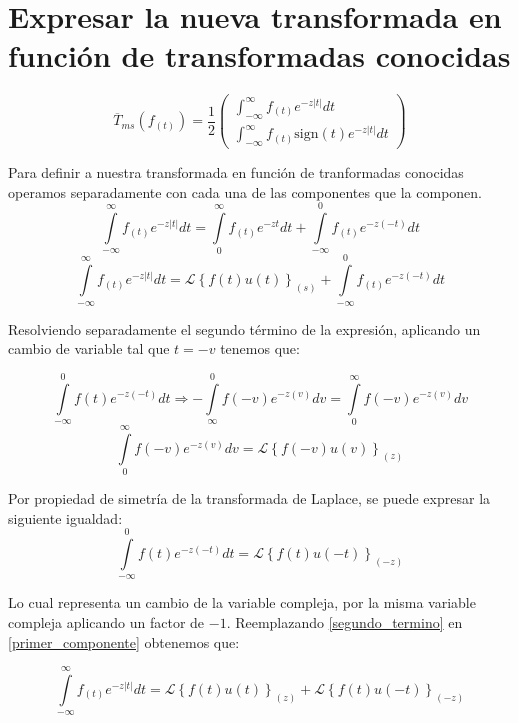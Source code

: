 \documentclass[12pt]{article}
\begin{document}
\section{Expresar la nueva transformada en función de transformadas conocidas}

\begin{equation}
\overline{T}_{ms}(f_{(t)}) = \frac12
\begin{pmatrix}
\int_{-\infty}^{\infty} f_{(t)} e^{-z |t|}dt\\
\int_{-\infty}^{\infty} f_{(t)} \textrm{sign}(t)e^{-z |t|}dt
\end{pmatrix}
\label{transformada_original}
\end{equation}

Para definir a nuestra transformada en función de tranformadas conocidas operamos separadamente con cada una de las componentes que la componen.
$$
\int\limits_{-\infty}^{\infty} f_{(t)} e^{-z |t|}dt= \int\limits_{0}^{\infty} f_{(t)} e^{-z t}dt + \int\limits_{-\infty}^{0} f_{(t)} e^{-z (-t)}dt$$
\begin{equation}
\int\limits_{-\infty}^{\infty} f_{(t)} e^{-z |t|}dt= \mathcal{L}\left\{f(t)u(t)\right\}_{(s)} +  \int\limits_{-\infty}^{0} f_{(t)} e^{-z (-t)}dt
\label{primer_componente}
\end{equation}

Resolviendo separadamente el segundo término de la expresión, aplicando un cambio de variable tal que $t=-v$ tenemos que:

$$ \int\limits_{-\infty}^{0} f(t) e^{-z (-t)}dt \Rightarrow - \int\limits_{\infty}^{0} f(-v) e^{-z (v)}dv =  \int\limits_{0}^{\infty} f(-v) e^{-z (v)}dv $$
$$\int\limits_{0}^{\infty} f(-v) e^{-z (v)}dv = \mathcal{L}\left\{f(-v) u(v)\right\}_{(z)}$$

Por propiedad de simetría de la transformada de Laplace, se puede expresar la siguiente igualdad:
 \begin{equation}
 \int\limits_{-\infty}^{0} f(t) e^{-z (-t)}dt = \mathcal{L}\left\{f(t)u(-t)\right\}_{(-z)} 
 \label{segundo_termino}
 \end{equation}
 
Lo cual representa un cambio de la variable compleja, por la misma variable compleja aplicando un factor de $-1$. Reemplazando \ref{segundo_termino} en \ref{primer_componente} obtenemos que:

\begin{equation}
\int\limits_{-\infty}^{\infty} f_{(t)} e^{-z |t|}dt= \mathcal{L}\left\{f(t)u(t)\right\}_{(z)} +  \mathcal{L}\left\{f(t)u(-t)\right\}_{(-z)}
\label{primer_componente_final}
\end{equation}
\end{document}
